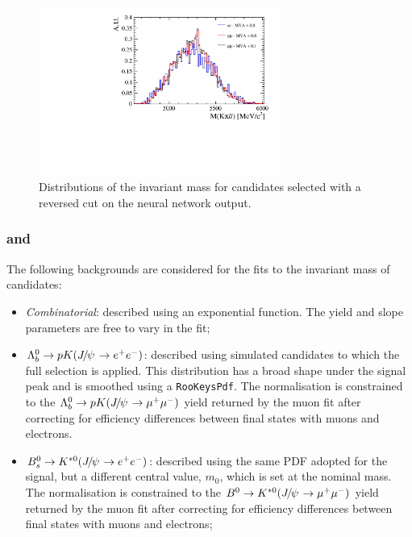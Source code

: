 \begin{figure}[t!]
\vspace{2cm}

\centering
\includegraphics[width=0.7\textwidth]{RKst/figs/Background/highq2_comb.pdf}
\caption{Distributions of the \mKpill invariant mass for \BdToKstll candidates selected with a reversed cut on the neural network output.}
\label{fig:highq2_comb}
\end{figure}

\subsubsection*{\BdToKstJPs and \BdToKstPsi}

The following backgrounds are considered for the fits to the invariant mass of \BdToKstJPsee candidates:
%
\begin{itemize}

\item \textit{Combinatorial}: described using an exponential function. The yield and slope parameters are free to vary in the fit;

\item $\Lb\to pK(\jpsi\to\ee)$: described using simulated candidates to which the full selection is applied. This distribution has a broad 
shape under the signal peak and is smoothed using a \texttt{RooKeysPdf}. The normalisation is constrained to the 
$\Lb\to pK(\jpsi\to\mumu)$ yield returned by the muon fit after correcting for efficiency differences between final states with muons and electrons.

\item $\Bs\to\Kstarz(\jpsi\to\ee)$: described using the same PDF adopted for the signal, but a different central value, $m_0$, which is set at the \Bs nominal mass. The normalisation is constrained to the $\Bd\to\Kstarz(\jpsi\to\mumu)$ yield returned by the muon fit after correcting for efficiency differences between final states with muons and electrons;

\end{itemize}

